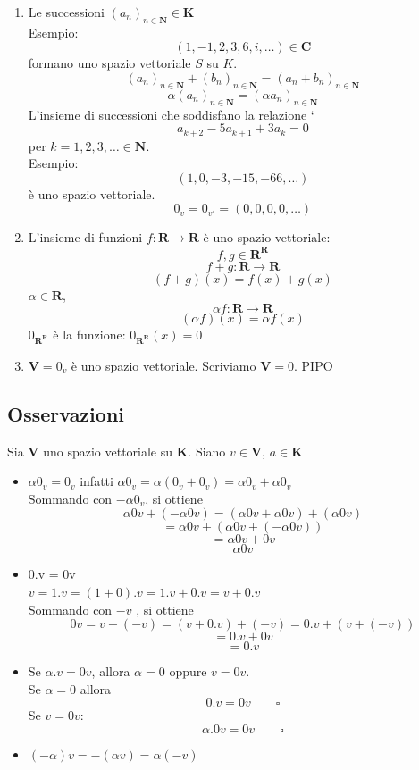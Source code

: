 \documentclass[12pt]{article}
\begin{document}
\begin{enumerate}
\item Le successioni $(a_n)_{n \in \mathbf{N}} \in \mathbf{K}$\\
Esempio: \[(1, -1, 2, 3, 6, i, \dots) \in \mathbf{C}\]
formano uno spazio vettoriale $S$ su $K$.
\[(a_n)_{n \in \mathbf{N}} + (b_n)_{n \in \mathbf{N}} = (a_n + b_n)_{n \in \mathbf{N}} \]
\[\alpha(a_n)_{n \in \mathbf{N}} = (\alpha a_n)_{n \in \mathbf{N}}\]
L'insieme di successioni che soddisfano la relazione
`\[a_{k+2} - 5a_{k+1} + 3a_k = 0\]
per $k = 1, 2, 3, \dots \in \mathbf{N}$.\\
Esempio:
\[(1, 0, -3, -15, -66, \dots)\]
è uno spazio vettoriale.
\[0_v = 0_{v'} = (0, 0, 0, 0, \dots)\]
\item L'insieme di funzioni $f: \mathbf{R} \rightarrow \mathbf{R}$ è uno spazio vettoriale:
\[f, g \in \mathbf{R}^{\mathbf{R}}\]
\[f + g: \mathbf{R} \rightarrow \mathbf{R}\]
\[(f+g)(x) = f(x) + g(x)\]
$\alpha \in \mathbf{R}$,
\[\alpha f: \mathbf{R} \rightarrow \mathbf{R}\]
\[(\alpha f)(x) = \alpha f(x)\]
$0_{\mathbf{R}^{\mathbf{R}}}$ è la funzione: $0_{\mathbf{R}^{\mathbf{R}}}(x) = 0$
\item $\mathbf{V} = {0_v}$ è uno spazio vettoriale. Scriviamo $\mathbf{V} = 0$.
PIPO
\end{enumerate}

\subsection{Osservazioni}

Sia $\mathbf{V}$ uno spazio vettoriale su $\mathbf{K}$. Siano $v \in \mathbf{V}$, $a \in \mathbf{K}$

\begin{itemize}
    \item $\alpha 0_v = 0_v$ infatti $\alpha 0_v = \alpha(0_v + 0_v) = \alpha0_v + \alpha0_v$\\
    Sommando con $-\alpha0_v$, si ottiene \[\alpha 0v + (-\alpha 0v) = (\alpha 0v + \alpha 0v) + (\alpha 0v)\]
    \[= \alpha 0v + (\alpha 0v + (-\alpha 0v))\]
    \[= \alpha 0v + 0v\]
    \[\alpha 0v\]
    \item 0.v = 0v\\
    $v = 1.v = (1+0).v = 1.v + 0.v = v + 0.v$\\
    Sommando con $-v$ , si ottiene
    \[0v = v + (-v) = (v+0.v) + (-v) = 0.v + (v + (-v))\]
    \[= 0.v + 0v\]
    \[= 0.v\]
    \item Se $\alpha.v = 0v$, allora $\alpha = 0$ oppure $v = 0v$.\\
    Se $\alpha = 0$ allora
    \[0.v = 0v \quad \quad \square\]
    Se $v = 0v$:
    \[\alpha.0v = 0v \quad \quad \square\]
    \item $(-\alpha)v = -(\alpha v) = \alpha (-v)$
\end{itemize}
\end{document}
